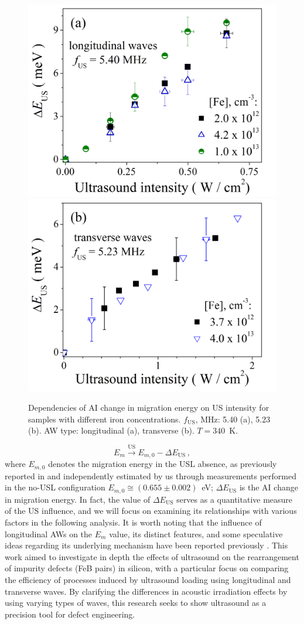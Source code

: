 \documentclass{ttp}
\begin{document}
\begin{figure}
	\centering
     \includegraphics[width=0.4\linewidth]{Fig2a.png}
     \includegraphics[width=0.4\linewidth]{Fig2b.png}
	  \caption{Dependencies of AI change in migration energy on US intensity for
       samples with different  iron concentrations.
       $f_\mathrm{US}$, MHz: 5.40 (a), 5.23 (b).
       AW type: longitudinal (a), transverse (b).
       $T=340$~K.
}\label{fig2}
\end{figure}

\begin{equation}
\label{eqEmUs}
E_m \xrightarrow{\mathrm{US}} E_{m,0}-\Delta E_\mathrm{US}\,,
\end{equation}
where
$E_{m,0}$ denotes the migration energy in the USL absence,
as previously reported in \cite{FeBAssJAP2014}
and independently estimated by us through measurements performed in the no-USL configuration
$E_{m,0}\cong(0.655\pm0.002)$~eV;
$\Delta E_\mathrm{US}$ is the AI change in migration energy.
In fact, the value of $\Delta E_\mathrm{US}$ serves as a quantitative measure
of the US influence, and we will focus on examining its relationships with various factors in the following analysis.
It is worth noting that the influence of longitudinal AWs on the $E_m$ value,
its distinct features, and some speculative ideas regarding its underlying mechanism have been reported previously \cite{Olikh2021JAP,Olikh2022:JMatSci}.
This work aimed to investigate in depth the effects of ultrasound on the rearrangement of impurity defects 
(FeB pairs) in silicon, with a particular focus on comparing the efficiency of processes induced by ultrasound loading 
using longitudinal and transverse waves. 
By clarifying the differences in acoustic irradiation effects by using varying types of waves, 
this research seeks to show ultrasound as a precision tool for defect engineering.
\end{document}
